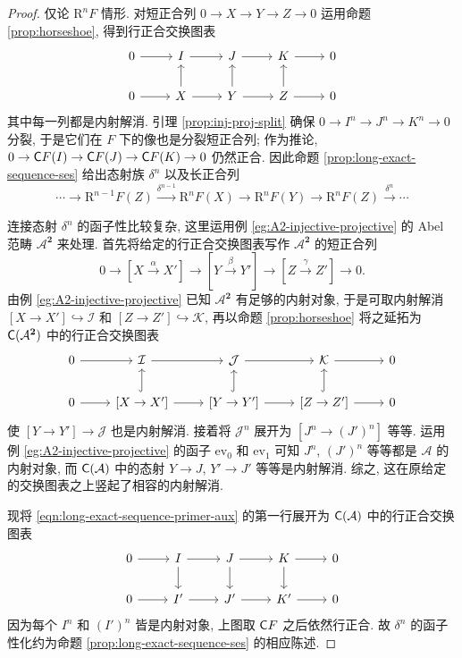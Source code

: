 \begin{proof}
	仅论 $\mathrm{R}^n F$ 情形. 对短正合列 $0 \to X \to Y \to Z \to 0$ 运用命题 \ref{prop:horseshoe}, 得到行正合交换图表
	\[\begin{tikzcd}
		0 \arrow[r] & I \arrow[r] & J \arrow[r] & K \arrow[r] & 0 \\
		0 \arrow[r] & X \arrow[r] \arrow[u] & Y \arrow[r] \arrow[u] & Z \arrow[r] \arrow[u] & 0
	\end{tikzcd}\]
	其中每一列都是内射解消. 引理 \ref{prop:inj-proj-split} 确保 $0 \to I^n \to J^n \to K^n \to 0$ 分裂, 于是它们在 $F$ 下的像也是分裂短正合列; 作为推论, $0 \to \mathsf{C}F(I) \to \mathsf{C}F(J) \to \mathsf{C}F(K) \to 0$ 仍然正合. 因此命题 \ref{prop:long-exact-sequence-ses} 给出态射族 $\delta^n$ 以及长正合列
	\[ \cdots \to \mathrm{R}^{n-1} F(Z) \xrightarrow{\delta^{n-1}} \mathrm{R}^n F(X) \to \mathrm{R}^n F(Y) \to \mathrm{R}^n F(Z) \xrightarrow{\delta^n} \cdots \]
	
	连接态射 $\delta^n$ 的函子性比较复杂, 这里运用例 \ref{eg:A2-injective-projective} 的 Abel 范畴 $\mathcal{A}^{\mathbf{2}}$ 来处理. 首先将给定的行正合交换图表写作 $\mathcal{A}^{\mathbf{2}}$ 的短正合列
	\[ 0 \to [X \xrightarrow{\alpha} X'] \to [Y \xrightarrow{\beta} Y'] \to [Z \xrightarrow{\gamma} Z'] \to 0. \]
	由例 \ref{eg:A2-injective-projective} 已知 $\mathcal{A}^{\mathbf{2}}$ 有足够的内射对象, 于是可取内射解消 $[X \to X'] \hookrightarrow \mathcal{I}$ 和 $[Z \to Z'] \hookrightarrow \mathcal{K}$, 再以命题 \ref{prop:horseshoe} 将之延拓为 $\mathsf{C}(\mathcal{A}^{\mathbf{2}})$ 中的行正合交换图表
	\begin{equation}\label{eqn:long-exact-sequence-primer-aux}\begin{tikzcd}
		0 \arrow[r] & \mathcal{I} \arrow[r] & \mathcal{J} \arrow[r] & \mathcal{K} \arrow[r] & 0 \\
		0 \arrow[r] & {[X \to X']} \arrow[r] \arrow[hookrightarrow, u] & {[Y \to Y']} \arrow[r] \arrow[hookrightarrow, u] & {[Z \to Z']} \arrow[r] \arrow[hookrightarrow, u] & 0
	\end{tikzcd}\end{equation}
	使 $[Y \to Y'] \to \mathcal{J}$ 也是内射解消. 接着将 $\mathcal{J}^n$ 展开为 $[J^n \to (J')^n]$ 等等. 运用例 \ref{eg:A2-injective-projective} 的函子 $\mathrm{ev}_0$ 和 $\mathrm{ev}_1$ 可知 $J^n$, $(J')^n$ 等等都是 $\mathcal{A}$ 的内射对象, 而 $\mathsf{C}(\mathcal{A})$ 中的态射 $Y \to J$, $Y' \to J'$ 等等是内射解消. 综之, 这在原给定的交换图表之上竖起了相容的内射解消.
	
	现将 \eqref{eqn:long-exact-sequence-primer-aux} 的第一行展开为 $\mathsf{C}(\mathcal{A})$ 中的行正合交换图表
	\[\begin{tikzcd}
		0 \arrow[r] & I \arrow[d] \arrow[r] & J \arrow[d] \arrow[r] & K \arrow[d] \arrow[r] & 0 \\
		0 \arrow[r] & I' \arrow[r] & J' \arrow[r] & K' \arrow[r] & 0
	\end{tikzcd}\]
	因为每个 $I^n$ 和 $(I')^n$ 皆是内射对象, 上图取 $\mathsf{C}F$ 之后依然行正合. 故 $\delta^n$ 的函子性化约为命题 \ref{prop:long-exact-sequence-ses} 的相应陈述.
\end{proof}

